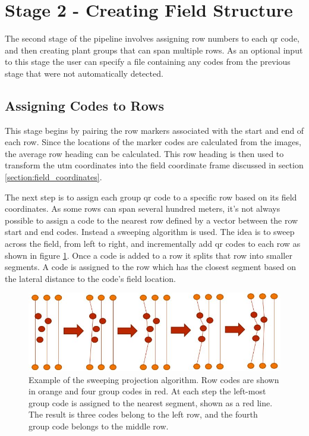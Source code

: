 \section{Stage 2 - Creating Field Structure}
\label{processing-stage2}

The second stage of the pipeline involves assigning row numbers to each \ac{qr} code, and then creating plant groups that can span multiple rows.  As an optional input to this stage the user can specify a file containing any codes from the previous stage that were not automatically detected.  

\subsection{Assigning Codes to Rows}

This stage begins by pairing the row markers associated with the start and end of each row.  Since the locations of the marker codes are calculated from the images, the average row heading can be calculated.  This row heading is then used to transform the \ac{utm} coordinates into the field coordinate frame discussed in section \ref{section:field_coordinates}.

The next step is to assign each group \ac{qr} code to a specific row based on its field coordinates.  As some rows can span several hundred meters, it's not always possible to assign a code to the nearest row defined by a vector between the row start and end codes.  Instead a sweeping algorithm is used.   The idea is to sweep across the field, from left to right, and incrementally add \ac{qr} codes to each row as shown in figure \ref{figure:sweeping_algorithm}. Once a code is added to a row it splits that row into smaller segments.  A code is assigned to the row which has the closest segment based on the lateral distance to the code's field location. 

\begin{figure}
	\centering
    \includegraphics[width=6in]{figures/sweeping_algorithm.jpg}
    \caption[Sweeping projection algorithm]{Example of the sweeping projection algorithm. Row codes are shown in orange and four group codes in red.  At each step the left-most group code is assigned to the nearest segment, shown as a red line.  The result is three codes belong to the left row, and the fourth group code belongs to the middle row.}
    \label{figure:sweeping_algorithm}
\end{figure}

